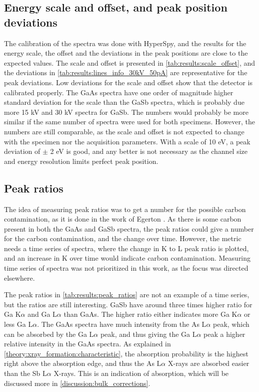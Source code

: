 \subsection{Energy scale and offset, and peak position deviations}
\label{discussion:scale_offset}

The calibration of the spectra was done with HyperSpy, and the results for the energy scale, the offset and the deviations in the peak positions are close to the expected values.
The scale and offset is presented in \cref{tab:results:scale_offset}, and the deviations in \cref{tab:results:lines_info_30kV_50pA} are representative for the peak deviations.
Low deviations for the scale and offset show that the detector is calibrated properly.
The GaAs spectra have one order of magnitude higher standard deviation for the scale than the GaSb spectra, which is probably due more 15 kV and 30 kV spectra for GaSb.
The numbers would probably be more similar if the same number of spectra were used for both specimens.
However, the numbers are still comparable, as the scale and offset is not expected to change with the specimen nor the acquisition parameters.
With a scale of 10 eV, a peak deviation of $\pm$ 2 eV is good, and any better is not necessary as the channel size and energy resolution limits perfect peak position.




\subsection{Peak ratios}
\label{discussion:peak_ratios}

The idea of measuring peak ratios was to get a number for the possible carbon contamination, as it is done in the work of Egerton \cite{egerton_nio_characterization_1994}.
As there is some carbon present in both the GaAs and GaSb spectra, the peak ratios could give a number for the carbon contamination, and the change over time.
However, the metric needs a time series of spectra, where the change in K to L peak ratio is plotted, and an increase in K over time would indicate carbon contamination.
Measuring time series of spectra was not prioritized in this work, as the focus was directed elsewhere.

The peak ratios in \cref{tab:results:peak_ratios} are not an example of a time series, but the ratios are still interesting.
GaSb have around three times higher ratio for Ga K$\alpha$ and Ga L$\alpha$ than GaAs.
The higher ratio either indicates more Ga K$\alpha$ or less Ga L$\alpha$.
The GaAs spectra have much intensity from the As L$\alpha$ peak, which can be absorbed by the Ga L$\alpha$ peak, and thus giving the Ga L$\alpha$ peak a higher relative intensity in the GaAs spectra.
As explained in \cref{theory:xray_formation:characteristic}, the absorption probability is the highest right above the absorption edge, and thus the As L$\alpha$ X-rays are absorbed easier than the Sb L$\alpha$ X-rays.
This is an indication of absorption, which will be discussed more in \cref{discussion:bulk_corrections}.



